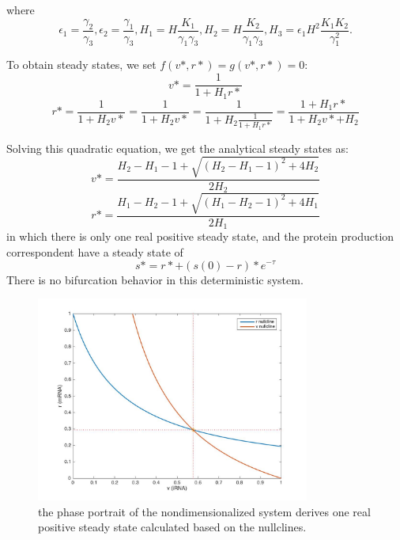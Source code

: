 \documentclass[fleqn,10pt]{wlscirep}
\begin{document}
where 
\begin{equation}
\epsilon_1 = \frac{\gamma_2}{\gamma_3}, 
\epsilon_2 = \frac{\gamma_1}{\gamma_3}, 
H_1 = H\frac{K_1}{\gamma_1\gamma_3}, 
H_2 = H\frac{K_2}{\gamma_1\gamma_3}, 
H_3 = \epsilon_1H^2\frac{K_1K_2}{\gamma_1^2}.
\end{equation}

To obtain steady states, we set $f(v*, r*) = g(v*, r*) = 0$:
\begin{equation}
v* = \frac{1}{1 + H_1r*}
\end{equation}
\begin{equation}
r* = \frac{1}{1 + H_2v*} = \frac{1}{1 + H_2v*} = \frac{1}{1 + H_2\frac{1}{1 + H_1r*}} = \frac{1 + H_1r*}{1 + H_2v* + H_2} 
\end{equation}

Solving this quadratic equation, we get the analytical steady states as:
\begin{equation}
v* = \frac{H_2 - H_1 - 1 + \sqrt{(H_2 - H_1 - 1)^2 + 4H_2}}{2H_2}
\end{equation}
\begin{equation}
r* = \frac{H_1 - H_2 - 1 + \sqrt{(H_1 - H_2 - 1)^2 + 4H_1}}{2H_1}
\end{equation}
in which there is only one real positive steady state, and the protein production correspondent have a steady state of \begin{equation}
s* = r* + (s(0) - r)*e^{-\tau}
\end{equation}
There is no bifurcation behavior in this deterministic system.


\begin{figure}[ht]
\centering
\includegraphics[width=9cm]{deterss}
\caption{the phase portrait of the nondimensionalized system derives one real positive steady state calculated based on the nullclines.}
\label{fig:deterss}
\end{figure}
\end{document}
